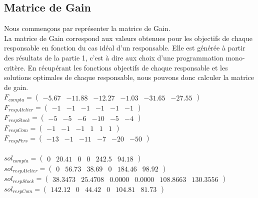 \documentclass[a4paper, 11pt]{article}
\begin{document}
\subsection{Matrice de Gain}
Nous commençons par représenter la matrice de Gain.\\
La matrice de Gain correspond aux valeurs obtenues pour les objectifs de chaque responsable en fonction du cas idéal d’un responsable. Elle est générée à partir des résultats de la partie 1, c’est à dire aux choix d’une programmation mono-critère.
En récupérant les fonctions objectifs de chaque responsable et les solutions optimales de chaque responsable, nous pouvons donc calculer la matrice de gain.\\
$F_{compta} =  \begin{pmatrix}-5.67  &-11.88  &-12.27  &-1.03  &-31.65  &-27.55 \end{pmatrix} $ \\
$F_{respAtelier} =  \begin{pmatrix}-1 & -1 & -1 & -1 & -1 & -1 \end{pmatrix} $ \\
$F_{respStock} =  \begin{pmatrix}-5 & -5 & -6 & -10 & -5 & -4 \end{pmatrix} $ \\
$F_{respCom} = \begin{pmatrix}-1 &-1 &-1 &1 &1 &1 \end{pmatrix} $ \\
$F_{respPers} = \begin{pmatrix}-13 &-1 &-11 &-7 &-20 &-50 \end{pmatrix} $ \\\\
$sol_{compta}  =  \begin{pmatrix}0 &20.41 &0 &0 &242.5 &94.18 \end{pmatrix} $ \\
$sol_{respAtelier} =  \begin{pmatrix}0 &56.73 &38.69 &0 &184.46 &98.92 \end{pmatrix} $ \\
$sol_{respStock} =  \begin{pmatrix}38.3473 &25.4708 &0.0000 &0.0000 &108.8663 &130.3556 \end{pmatrix} $ \\
$sol_{respCom}  =  \begin{pmatrix}142.12 &0 &44.42 &0 &104.81 &81.73 \end{pmatrix} $ \\
\end{document}
